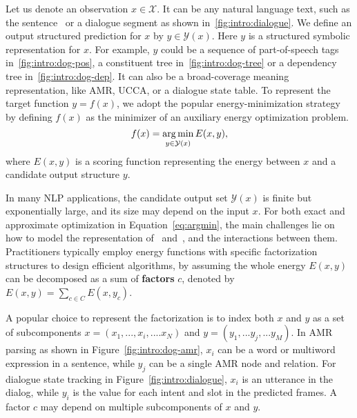 Let us denote an observation $x \in \mathcal{X}$. It can be any natural
language text, such as the sentence~ or a dialogue segment as shown
in~\autoref{fig:intro:dialogue}. We define an output structured
prediction for $x$ by $y \in \mathcal{Y}(x)$. Here $y$ is a structured
symbolic representation for $x$. For example, $y$ could be a sequence
of part-of-speech tags in~\autoref{fig:intro:dog-pos}, a constituent
tree in~\autoref{fig:intro:dog-tree} or a dependency tree
in~\autoref{fig:intro:dog-dep}. It can also be a broad-coverage
meaning representation, like AMR, UCCA, or a dialogue state table. To
represent the target function $y=f(x)$, we adopt the popular
energy-minimization strategy by defining $f(x)$ as the minimizer of an
auxiliary energy optimization problem.
\begin{equation}
\label{eq:argmin}
f(x) = \operatorname*{arg\,min}_{y \in \mathcal{Y}(x)} E(x, y),
\end{equation}
where $E(x,y)$ is a scoring function representing the energy between
$x$ and a candidate output structure $y$.

In many NLP applications, the candidate output set $\mathcal{Y}(x)$ is
finite but exponentially large, and its size may depend on the input
$x$. For both exact and approximate optimization in
Equation~\ref{eq:argmin}, the main challenges lie on how to model the
representation of \IN~and~\OUT, and the interactions between
them. Practitioners typically employ energy functions with specific
factorization structures to design efficient algorithms, by assuming
the whole energy $E(x, y)$ can be decomposed as a sum of
\textbf{factors} $c$, denoted by $E(x, y) =\sum_{c \in C} E(x, y_{c})$.

A popular choice to represent the factorization is to index both $x$
and $y$ as a set of subcomponents $x=(x_{1},..., x_{i},.... x_{N})$
and $y=(y_{1},...y_{j},...y_{M})$. In AMR parsing as shown in
Figure~\ref{fig:intro:dog-amr}, $x_{i}$ can be a word or multiword
expression in a sentence, while $y_{j}$ can be a single AMR node and
relation.  For dialogue state tracking in
Figure~\ref{fig:intro:dialogue}, $x_{i}$ is an utterance in the
dialog, while $y_{i}$ is the value for each intent and slot in the
predicted frames. A factor $c$ may depend on multiple subcomponents
of $x$ and $y$.

